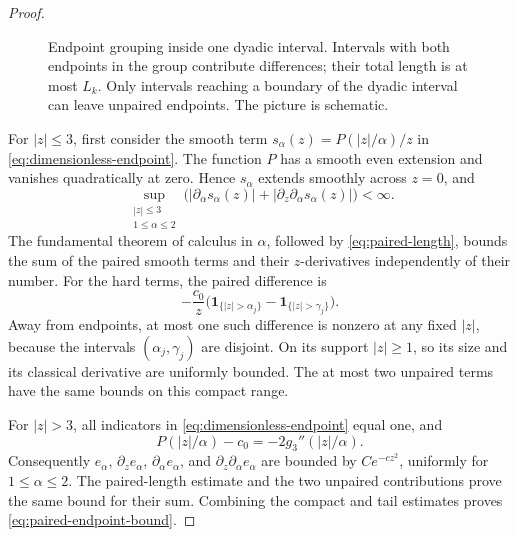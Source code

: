 \begin{proof}
\begin{figure}[t]
\centering
{}
\caption{Endpoint grouping inside one dyadic interval.  Intervals with
both endpoints in the group contribute differences; their total
length is at most $L_k$.  Only intervals reaching a boundary of the
dyadic interval can leave unpaired endpoints.  The picture is schematic.}
\label{fig:endpoint-pairing}
\end{figure}

For $|z|\le3$, first consider the smooth term
$s_\alpha(z)=P(|z|/\alpha)/z$ in \eqref{eq:dimensionless-endpoint}.
The function $P$ has a smooth even extension and vanishes quadratically
at zero.  Hence $s_\alpha$ extends smoothly across $z=0$, and
\[
 \sup_{\substack{|z|\le3\\1\le\alpha\le2}}
 \bigl(|\partial_\alpha s_\alpha(z)|
       +|\partial_z\partial_\alpha s_\alpha(z)|\bigr)<\infty.
\]
The fundamental theorem of calculus in $\alpha$, followed by
\eqref{eq:paired-length}, bounds the sum of the paired smooth terms
and their $z$-derivatives independently of their number.
For the hard terms, the paired difference is
\[
 -\frac{c_0}{z}
    \bigl(\mathbf1_{\{|z|>\alpha_j\}}
          -\mathbf1_{\{|z|>\gamma_j\}}\bigr).
\]
Away from endpoints, at most one such difference is nonzero at any
fixed $|z|$, because the intervals $(\alpha_j,\gamma_j)$ are disjoint.
On its support $|z|\ge1$, so its size and its classical derivative
are uniformly bounded.  The at most two unpaired terms have the
same bounds on this compact range.

For $|z|>3$, all indicators in \eqref{eq:dimensionless-endpoint}
equal one, and
\[
 P(|z|/\alpha)-c_0=-2g_3''(|z|/\alpha).
\]
Consequently $e_\alpha$, $\partial_z e_\alpha$,
$\partial_\alpha e_\alpha$, and
$\partial_z\partial_\alpha e_\alpha$ are bounded by
$Ce^{-cz^2}$, uniformly for $1\le\alpha\le2$.
The paired-length estimate and the two unpaired contributions prove
the same bound for their sum.  Combining the compact and tail
estimates proves \eqref{eq:paired-endpoint-bound}.


\end{proof}
